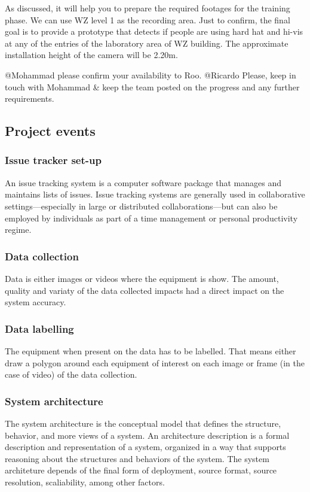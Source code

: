 \documentclass{article}
\begin{document}
\begin{enumerate}
\begin{enumerate}
As discussed, it will help you to prepare the required footages for the training phase.
We can use WZ level 1 as the recording area. Just to confirm, the final goal is to provide a prototype that detects if people are using hard hat and hi-vis at any of the entries of the laboratory area of WZ building.
The approximate installation height of the camera will be 2.20m.

@Mohammad please confirm your availability to Roo.
@Ricardo Please, keep in touch with Mohammad \& keep the team posted on the progress and any further requirements.
\subsection{Project events}
\label{sec:orgd752bce}
\subsubsection{Issue tracker set-up}
\label{sec:org9e77710}
An issue tracking system is a computer software package that manages and maintains lists of issues.
Issue tracking systems are generally used in collaborative settings—especially in large or distributed collaborations—but can also be employed by individuals as part of a time management or personal productivity regime.
\subsubsection{Data collection}
\label{sec:org0982d2e}
Data is either images or videos where the equipment is show.
The amount, quality and variaty of the data collected impacts had a direct impact on the system accuracy. 
\subsubsection{Data labelling}
\label{sec:org835b995}
The equipment when present on the data has to be labelled.
That means either draw a polygon around each equipment of interest on each image or frame (in the case of video) of the data collection.
\subsubsection{System architecture}
\label{sec:orgd08bbb9}
The system architecture is the conceptual model that defines the structure, behavior, and more views of a system.
An architecture description is a formal description and representation of a system, organized in a way that supports reasoning about the structures and behaviors of the system.
The system architeture depends of the final form of deployment, source format, source resolution, scaliability, among other factors.

\end{enumerate}
\end{enumerate}
\end{document}
